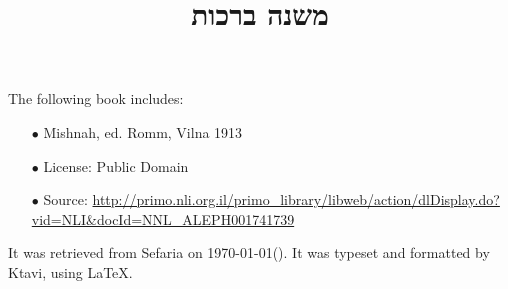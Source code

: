\documentclass[12pt, openany]{book}
\newcommand{\texttitle}{משנה ברכות}\usepackage{titlesec}
\begin{document}
\frontmatter
{}

\title{\texttitle}

\author{}

\date{}

\maketitle

\begin{minipage}[b][\textheight][b]{\textwidth}\englishfont	
	\begin{english}
		\vfill
		The following book includes:
\begin{itemize}
\item[$\bullet$] Mishnah, ed. Romm, Vilna 1913
\item[$\bullet$] License: Public Domain
\item[$\bullet$] Source: \url{http://primo.nli.org.il/primo_library/libweb/action/dlDisplay.do?vid=NLI&docId=NNL_ALEPH001741739}
\end{itemize}
		It was retrieved from Sefaria on \today\space \texthebrew{(\Hebrewtoday)}.  It was typeset and formatted by Ktavi, using \LaTeX .
		\clearpage
		
	\end{english}
\end{minipage}


\tableofcontents

\clearpage
\mainmatter
{}
\end{document}
